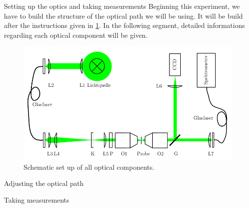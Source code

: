 \documentclass[pdftex, a4paper,11pt, twoside, UKenglish]{report}
\begin{document}
  \begin{chapter}{Setting up the optics and taking measurements}
    \label{chp:Setup}
    Beginning this experiment, we have to build the structure of the optical
    path we will be using. It will be build after the instructions given in
    \cref{fig:Setup}. In the following segment, detailed informations regarding
    each optical component will be given.
    \begin{figure}[hb]
      \centering
      \includegraphics[width=\textwidth]{Figures/Setup.png}
      \caption{Schematic set up of all optical components.\cite{bib:Anleitung}}
      \label{fig:Setup}
    \end{figure}
    
    \begin{section}{Adjusting the optical path}
      \label{chp:SetupOptics}
      
      
    \end{section}
    
    
    
    \begin{section}{Taking measurements}
      \label{chp:SetupMeasuring}
      

\end{section}
\end{chapter}
\end{document}
